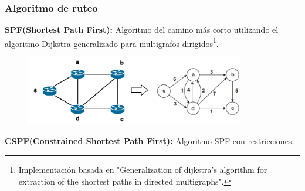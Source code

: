\documentclass{beamer}
\begin{document}
\begin{frame}
\frametitle{Algoritmo de ruteo} 

\textbf{SPF(Shortest Path First):} Algoritmo del camino m\'as corto utilizando el algoritmo Dijkstra generalizado para multigrafos dirigidos\footnote[frame]{\tiny Implementaci\'on basada en "Generalization of dijkstra's algorithm for extraction of the shortest paths in directed multigraphs".}.

\begin{figure}[H]
\centering
\includegraphics[width=0.85\textwidth]{imagenes/dijkstraRed.png}
\end{figure}

\pause
\textbf{CSPF(Constrained Shortest Path First):} Algoritmo SPF con restricciones.

\end{frame}
\end{document}
